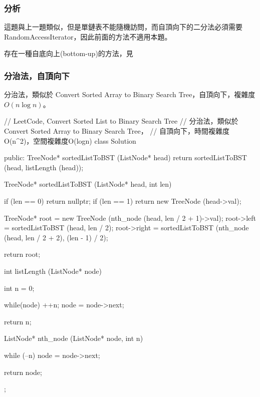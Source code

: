 \subsubsection{分析}
這題與上一題類似，但是單鏈表不能隨機訪問，而自頂向下的二分法必須需要RandomAccessIterator，因此前面的方法不適用本題。

存在一種自底向上(bottom-up)的方法，見


\subsubsection{分治法，自頂向下}
分治法，類似於 Convert Sorted Array to Binary Search Tree，自頂向下，複雜度$O(n\log n)$。
\begin{Code}
// LeetCode, Convert Sorted List to Binary Search Tree
// 分治法，類似於 Convert Sorted Array to Binary Search Tree，
// 自頂向下，時間複雜度O(n^2)，空間複雜度O(logn)
class Solution {
public:
    TreeNode* sortedListToBST (ListNode* head) {
        return sortedListToBST (head, listLength (head));
    }

    TreeNode* sortedListToBST (ListNode* head, int len) {
        if (len == 0) return nullptr;
        if (len == 1) return new TreeNode (head->val);

        TreeNode* root = new TreeNode (nth_node (head, len / 2 + 1)->val);
        root->left = sortedListToBST (head, len / 2);
        root->right = sortedListToBST (nth_node (head, len / 2 + 2), 
                (len - 1) / 2);

        return root;
    }

    int listLength (ListNode* node) {
        int n = 0;

        while(node) {
            ++n;
            node = node->next;
        }

        return n;
    }

    ListNode* nth_node (ListNode* node, int n) {
        while (--n)
            node = node->next;

        return node;
    }
};
\end{Code}


